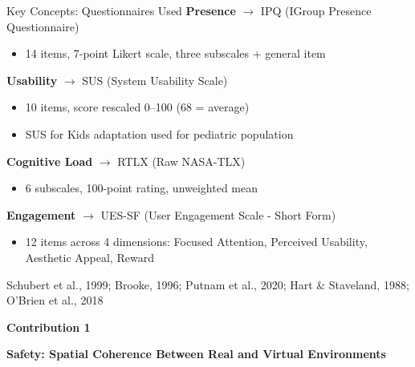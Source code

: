 \documentclass[aspectratio=169, 12pt]{beamer}
\newcommand{\citefooter}[1]{\hfill{\tiny #1}}
\begin{document}
\begin{frame}{Key Concepts: Questionnaires Used}
	\textbf{\textcolor{gbAqua}{Presence}} $\rightarrow$ IPQ (IGroup Presence Questionnaire)
	\begin{itemize}
		\item 14 items, 7-point Likert scale, three subscales + general item
	\end{itemize}

	\vspace{0.2cm}
	\textbf{\textcolor{gbAqua}{Usability}} $\rightarrow$ SUS (System Usability Scale)
	\begin{itemize}
		\item 10 items, score rescaled 0--100 (68 = average)
		\item SUS for Kids adaptation used for pediatric population
	\end{itemize}

	\vspace{0.2cm}
	\textbf{\textcolor{gbAqua}{Cognitive Load}} $\rightarrow$ RTLX (Raw NASA-TLX)
	\begin{itemize}
		\item 6 subscales, 100-point rating, unweighted mean
	\end{itemize}

	\vspace{0.2cm}
	\textbf{\textcolor{gbAqua}{Engagement}} $\rightarrow$ UES-SF (User Engagement Scale - Short Form)
	\begin{itemize}
		\item 12 items across 4 dimensions: Focused Attention, Perceived Usability, Aesthetic Appeal, Reward
	\end{itemize}

	\citefooter{Schubert et al., 1999; Brooke, 1996; Putnam et al., 2020; Hart \& Staveland, 1988; O'Brien et al., 2018}
\end{frame}



\begin{frame}[plain]
	\vfill
	\begin{center}
		{\large \textcolor{gbAqua}{\textbf{Contribution 1}}}
		
		\vspace{0.4cm}
		
		{\LARGE \textbf{Safety: Spatial Coherence Between Real and Virtual Environments}}
		
		\vspace{0.4cm}
	\end{center}
	\vfill
\end{frame}
\end{document}
